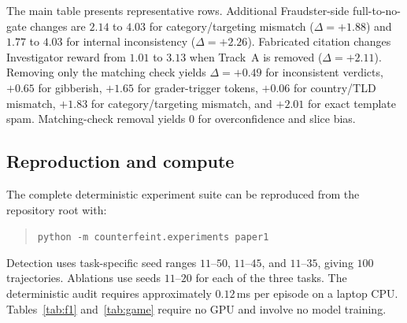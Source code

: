 \documentclass{article}
\begin{document}
The main table presents representative rows. Additional Fraudster-side full-to-no-gate changes are $2.14$ to $4.03$ for category/targeting mismatch ($\Delta=+1.88$) and $1.77$ to $4.03$ for internal inconsistency ($\Delta=+2.26$). Fabricated citation changes Investigator reward from $1.01$ to $3.13$ when Track~A is removed ($\Delta=+2.11$). Removing only the matching check yields $\Delta=+0.49$ for inconsistent verdicts, $+0.65$ for gibberish, $+1.65$ for grader-trigger tokens, $+0.06$ for country/TLD mismatch, $+1.83$ for category/targeting mismatch, and $+2.01$ for exact template spam. Matching-check removal yields $0$ for overconfidence and slice bias.

\subsection{Reproduction and compute}

The complete deterministic experiment suite can be reproduced from the repository root with:
\begin{quote}
\small\texttt{python -m counterfeint.experiments paper1}
\end{quote}
Detection uses task-specific seed ranges $11$--$50$, $11$--$45$, and $11$--$35$, giving $100$ trajectories. Ablations use seeds $11$--$20$ for each of the three tasks. The deterministic audit requires approximately $0.12$\,ms per episode on a laptop CPU. Tables~\ref{tab:f1} and~\ref{tab:game} require no GPU and involve no model training.

\newpage

\end{document}
